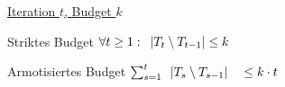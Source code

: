 \begin{frame}
    \frametitle{\insertsubsection}
    \underline{Iteration $t$, Budget $k$}\\
    \vspace{1em}
    \begin{block}{Striktes Budget}
        \vspace{1em}
        $\forall t \geq 1:\hspace{0.5em}|T_t \setminus T_{t-1}| \leq k$
        \vspace{1em}
    \end{block}
    \vspace{1em}
    \begin{block}{Armotisiertes Budget}
        \vspace{1em}
        $ \sum_{s=1}^{t}\hspace{0.5em}|T_s \setminus T_{s-1}| \quad \leq k \cdot t$
        \vspace{1em}
    \end{block}
\end{frame}
